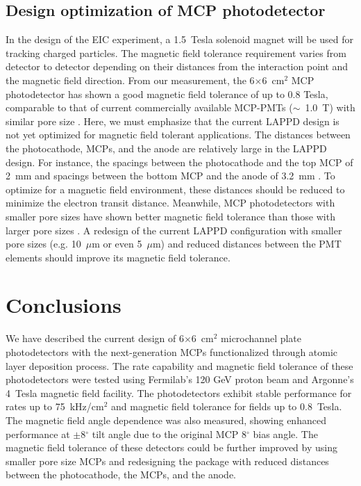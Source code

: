 \documentclass[preprint,5p]{elsarticle}
\begin{document}
\subsection{Design optimization of MCP photodetector}\label{subsec_opt}
In the design of the EIC experiment, a 1.5~Tesla solenoid magnet will be used 
for tracking charged particles. The magnetic field tolerance requirement varies 
from detector to detector depending on their distances from the interaction 
point and the magnetic field direction. From our measurement, the 
6$\times$6~cm$^2$ MCP photodetector has shown a good magnetic field 
tolerance of up to 0.8 Tesla, comparable to that of current commercially 
available MCP-PMTs ($\sim$~1.0~T) with similar pore size \cite{MCPs-B}. Here, 
we must emphasize that the current LAPPD design is not yet optimized for 
magnetic field tolerant applications. The distances between the photocathode, 
MCPs, and the anode are relatively large in the LAPPD design. For instance, the 
spacings between the photocathode and the top MCP of 2~mm and spacings between 
the bottom MCP and the anode of 3.2~mm \cite{Wang-MCPs}. To optimize for a 
magnetic field environment, these distances should be reduced to minimize the 
electron transit distance. Meanwhile, MCP photodetectors with smaller pore 
sizes have shown better magnetic field tolerance than those with larger pore 
sizes \cite{MCPs-B, Lehmann, Ilieva}. A redesign of the current LAPPD 
configuration with smaller pore sizes (e.g.  10~$\mu$m or even 5~$\mu$m) and 
reduced distances between the PMT elements should improve its magnetic field 
tolerance. 

\section{Conclusions}
We have described the current design of 6$\times$6~cm$^2$ microchannel plate 
photodetectors with the next-generation MCPs functionalized through atomic 
layer deposition process. The rate capability and magnetic field tolerance of 
these photodetectors were tested using Fermilab's 120 GeV proton beam and 
Argonne's 4~Tesla magnetic field facility. The photodetectors exhibit stable 
performance for rates up to 75~kHz/cm$^2$ and magnetic field tolerance for 
fields up to 0.8~Tesla. The magnetic field angle dependence was also measured, 
showing enhanced performance at $\pm$8$^{\circ}$ tilt angle due to the original 
MCP 8$^{\circ}$ bias angle. The magnetic field tolerance of these detectors 
could be further improved by using smaller pore size MCPs and redesigning the 
package with reduced distances between the photocathode, the MCPs, and the 
anode.
 
\end{document}
